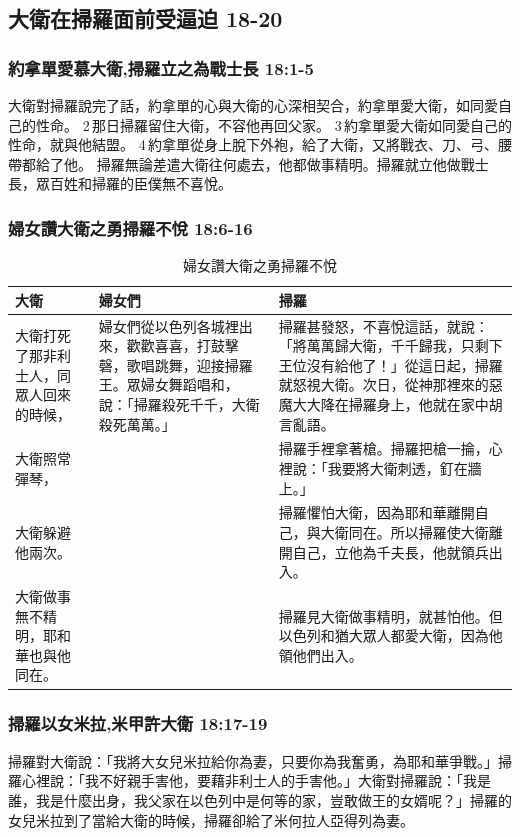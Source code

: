 \subsection{大衛在掃羅面前受逼迫 18-20 }
\subsubsection{約拿單愛慕大衛,掃羅立之為戰士長 18:1-5}
大衛對掃羅說完了話，約拿單的心與大衛的心深相契合，約拿單愛大衛，如同愛自己的性命。 2 那日掃羅留住大衛，不容他再回父家。 3 約拿單愛大衛如同愛自己的性命，就與他結盟。 4 約拿單從身上脫下外袍，給了大衛，又將戰衣、刀、弓、腰帶都給了他。
掃羅無論差遣大衛往何處去，他都做事精明。掃羅就立他做戰士長，眾百姓和掃羅的臣僕無不喜悅。

\subsubsection{婦女讚大衛之勇掃羅不悅 18:6-16}
\begin{table}[H]
\centering 
\begin{tabular}{p{3cm}|p{5cm}|p{8.5cm}}\hline\hline
大衛&婦女們&掃羅\\\hline
大衛打死了那非利士人，同眾人回來的時候，&婦女們從以色列各城裡出來，歡歡喜喜，打鼓擊磬，歌唱跳舞，迎接掃羅王。眾婦女舞蹈唱和，說：「掃羅殺死千千，大衛殺死萬萬。」 &掃羅甚發怒，不喜悅這話，就說：「將萬萬歸大衛，千千歸我，只剩下王位沒有給他了！」從這日起，掃羅就怒視大衛。次日，從神那裡來的惡魔大大降在掃羅身上，他就在家中胡言亂語。 \\\hline
大衛照常彈琴，&&掃羅手裡拿著槍。掃羅把槍一掄，心裡說：「我要將大衛刺透，釘在牆上。」 \\\hline
大衛躲避他兩次。&&掃羅懼怕大衛，因為耶和華離開自己，與大衛同在。所以掃羅使大衛離開自己，立他為千夫長，他就領兵出入。 \\\hline
大衛做事無不精明，耶和華也與他同在。&&掃羅見大衛做事精明，就甚怕他。但以色列和猶大眾人都愛大衛，因為他領他們出入。\\\hline
\end{tabular}
\caption{婦女讚大衛之勇掃羅不悅}
\end{table}

\subsubsection{掃羅以女米拉,米甲許大衛 18:17-19}
掃羅對大衛說：「我將大女兒米拉給你為妻，只要你為我奮勇，為耶和華爭戰。」掃羅心裡說：「我不好親手害他，要藉非利士人的手害他。」大衛對掃羅說：「我是誰，我是什麼出身，我父家在以色列中是何等的家，豈敢做王的女婿呢？」掃羅的女兒米拉到了當給大衛的時候，掃羅卻給了米何拉人亞得列為妻。 

